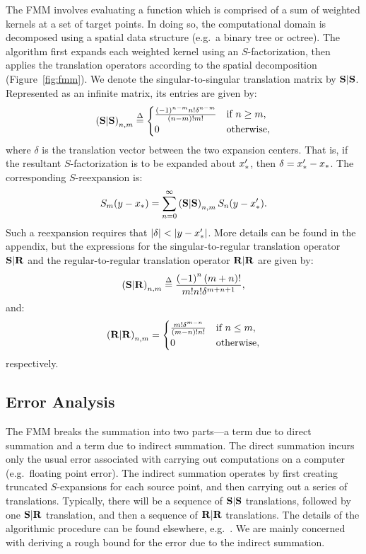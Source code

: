 The FMM involves evaluating a function which is comprised of a sum of
weighted kernels at a set of target points. In doing so, the
computational domain is decomposed using a spatial data structure
(e.g.\ a binary tree or octree). The algorithm first expands each
weighted kernel using an $S$-factorization, then applies the
translation operators according to the spatial decomposition
(Figure~\ref{fig:fmm}). We denote the singular-to-singular translation
matrix by $\bold{S}|\bold{S}$. Represented as an infinite matrix, its entries are
given by:
\begin{align}
  \label{eq:SSmat}
  \left(\bold{S}|\bold{S}\right)_{n,m} \overset{\Delta}{=} \begin{cases} \frac{{(-1)}^{n-m} n! \delta^{n-m}}{(n-m)!m!} & \mbox{if } n \geq m, \\
    0 & \mbox{otherwise,}
  \end{cases}
\end{align}
where $\delta$ is the translation vector between the two expansion
centers. That is, if the resultant $S$-factorization is to be expanded
about ${x}_{*}'$, then $\delta = {x}_{*}' - {x}_{*}$. The corresponding
$S$-reexpansion is:
\begin{align}
  \label{eq:SSmat-reexpansion}
  S_m(y - {x}_{*}) = \sum_{n=0}^\infty \left(\bold{S}|\bold{S}\right)_{n,m} S_n(y - {x}_{*}').
\end{align}
Such a reexpansion requires that $\left|\delta\right| < \left|y -
  {x}_{*}'\right|$. More details can be found in the appendix, but the
expressions for the singular-to-regular translation operator $\bold{S}|\bold{R}$
and the regular-to-regular translation operator $\bold{R}|\bold{R}$ are given by:
\begin{align}
  \label{eq:SRmat}
  \left(\bold{S}|\bold{R}\right)_{n,m} \overset{\Delta}{=} {\left(-1\right)^n \left(m + n\right)! \over m! n! \delta^{m+n+1}},
\end{align}
and:
\begin{align}
  \label{eq:RRmat}
  \left(\bold{R}|\bold{R}\right)_{n,m} = \begin{cases}
    \frac{m! \delta^{m - n}}{(m - n)!n!} & \mbox{if } n \leq m, \\
    0 & \mbox{otherwise},
  \end{cases}
\end{align}
respectively.

\subsection*{Error Analysis}

The FMM breaks the summation into two parts---a term due to direct
summation and a term due to indirect summation. The direct summation
incurs only the usual error associated with carrying out computations
on a computer (e.g.\ floating point error). The indirect summation
operates by first creating truncated $S$-expansions for each source
point, and then carrying out a series of translations. Typically,
there will be a sequence of $\bold{S}|\bold{S}$ translations, followed by one
$\bold{S}|\bold{R}$ translation, and then a sequence of $\bold{R}|\bold{R}$
translations. The details of the algorithmic procedure can be found
elsewhere, e.g.~\cite{fmm-orig}. We are mainly concerned with deriving
a rough bound for the error due to the indirect summation.

